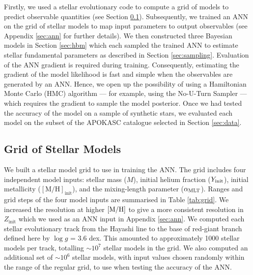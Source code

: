 Firstly, we used a stellar evolutionary code to compute a grid of models to predict observable quantities (see Section \ref{sec:grid}). Subsequently, we trained an ANN on the grid of stellar models to map input parameters to output observables (see Appendix \ref{sec:ann} for further details). We then constructed three Bayesian models in Section \ref{sec:hbm} which each sampled the trained ANN to estimate stellar fundamental parameters as described in Section \ref{sec:sampling}. Evaluation of the ANN gradient is required during training. Consequently, estimating the gradient of the model likelihood is fast and simple when the observables are generated by an ANN. Hence, we open up the possibility of using a Hamiltonian Monte Carlo (HMC) algorithm --- for example, using the No-U-Turn Sampler \citep[NUTS;][]{Hoffman.Gelman2014} --- which requires the gradient to sample the model posterior. Once we had tested the accuracy of the model on a sample of synthetic stars, we evaluated each model on the subset of the APOKASC catalogue selected in Section \ref{sec:data}.

\subsection{Grid of Stellar Models}\label{sec:grid}



We built a stellar model grid to use in training the ANN. The grid includes four independent model inputs: stellar mass ($M$), initial helium fraction ($Y_{\rm init}$), initial metallicity ($\mathrm{[M/H]}_\mathrm{init}$), and the mixing-length parameter (${\alpha_\mathrm{MLT}}$). Ranges and grid steps of the four model inputs are summarised in Table \ref{tab:grid}. We increased the resolution at higher $[\mathrm{M}/\mathrm{H}]$ to give a more consistent resolution in $Z_\mathrm{init}$ which we used as an ANN input in Appendix \ref{sec:ann}. We computed each stellar evolutionary track from the Hayashi line to the base of red-giant branch defined here by $\log g$ = 3.6 dex. This amounted to approximately 1000 stellar models per track, totalling $\sim 10^7$ stellar models in the grid.
We also computed an additional set of $\sim 10^6$ stellar models, with input values chosen randomly within the range of the regular grid, to use when testing the accuracy of the ANN.

